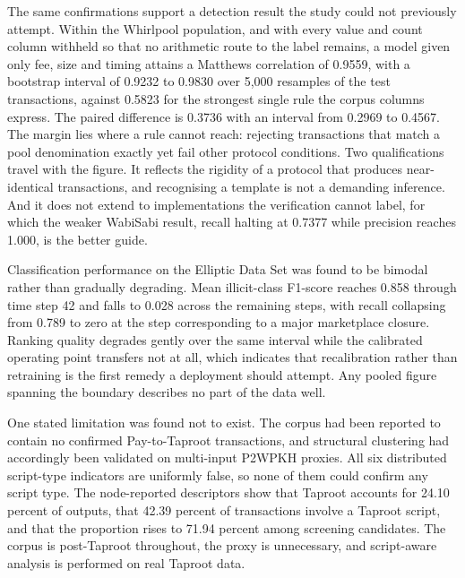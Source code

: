 \documentclass[12pt,a4paper]{article}
\begin{document}
The same confirmations support a detection result the study could
not previously attempt. Within the Whirlpool population, and with
every value and count column withheld so that no arithmetic route
to the label remains, a model given only fee, size and timing
attains a Matthews correlation of 0.9559, with a bootstrap
interval of 0.9232 to 0.9830 over 5{,}000 resamples of the test
transactions, against 0.5823 for the strongest single rule the
corpus columns express. The paired difference is 0.3736 with an
interval from 0.2969 to 0.4567. The margin lies where a rule cannot
reach: rejecting transactions that match a pool denomination
exactly yet fail other protocol conditions. Two qualifications
travel with the figure. It reflects the rigidity of a protocol
that produces near-identical transactions, and recognising a
template is not a demanding inference. And it does not extend to
implementations the verification cannot label, for which the
weaker WabiSabi result, recall halting at 0.7377 while precision
reaches 1.000, is the better guide.

Classification performance on the Elliptic Data Set was found to
be bimodal rather than gradually degrading. Mean illicit-class
F1-score reaches 0.858 through time step 42 and falls to 0.028
across the remaining steps, with recall collapsing from 0.789 to
zero at the step corresponding to a major marketplace closure.
Ranking quality degrades gently over the same interval while the
calibrated operating point transfers not at all, which indicates
that recalibration rather than retraining is the first remedy a
deployment should attempt. Any pooled figure spanning the
boundary describes no part of the data well.

One stated limitation was found not to exist. The corpus had been
reported to contain no confirmed Pay-to-Taproot transactions, and
structural clustering had accordingly been validated on
multi-input P2WPKH proxies. All six distributed script-type
indicators are uniformly false, so none of them could confirm any
script type. The node-reported descriptors show that Taproot
accounts for 24.10 percent of outputs, that 42.39 percent of
transactions involve a Taproot script, and that the proportion
rises to 71.94 percent among screening candidates. The corpus is
post-Taproot throughout, the proxy is unnecessary, and
script-aware analysis is performed on real Taproot data.
\end{document}
